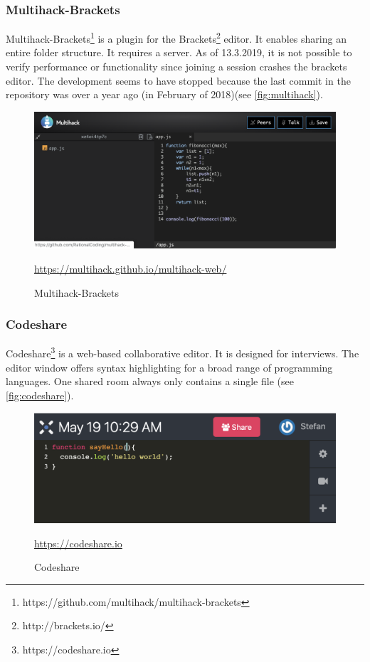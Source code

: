 \subsubsection{Multihack-Brackets}
Multihack-Brackets\footnote{https://github.com/multihack/multihack-brackets} is a plugin for the Brackets\footnote{http://brackets.io/} editor. It enables sharing an entire folder structure. It requires a server. As of 13.3.2019, it is not possible to verify performance or functionality since joining a session crashes the brackets editor. The development seems to have stopped because the last commit in the repository was over a year ago (in February of 2018)(see \autoref{fig:multihack}).
\begin{figure}[hb]
    \centering
    \includegraphics[width=1\linewidth]{figures/screenshots/multihack.png}
	\caption{Multihack-Brackets}
	\href{https://multihack.github.io/multihack-web/}{https://multihack.github.io/multihack-web/}
    \label{fig:multihack}
\end{figure}

\subsubsection{Codeshare}
Codeshare\footnote{https://codeshare.io} is a web-based collaborative editor. It is designed for interviews. The editor window offers syntax highlighting for a broad range of programming languages. One shared room always only contains a single file (see \autoref{fig:codeshare}).
\begin{figure}[h]
    \centering
    \includegraphics[width=1\linewidth]{figures/screenshots/codeshare.png}
	\caption{Codeshare}
	\href{https://codeshare.io}{https://codeshare.io}
    \label{fig:codeshare}
\end{figure}


